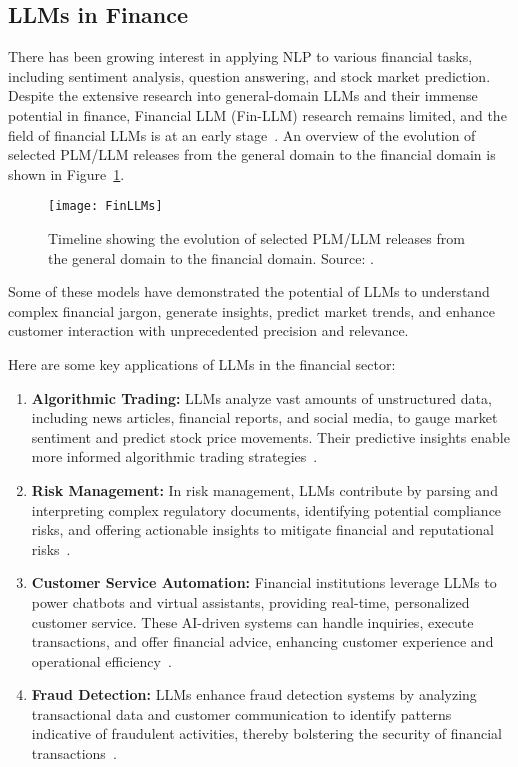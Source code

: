 \subsection{LLMs in Finance}
\label{subsec:llms-in-finance}

There has been growing interest in applying NLP to various financial tasks, including sentiment analysis, question answering, and stock market prediction.
Despite the extensive research into general-domain LLMs and their immense potential in finance, Financial LLM (Fin-LLM) research remains limited, and the field of financial LLMs is at an early stage~\cite{lee2024survey}.
An overview of the evolution of selected PLM/LLM releases from the general domain to the financial domain is shown in Figure~\ref{fig:llm-finance}.

\begin{figure}[h]
	\centering
	\texttt{[image: FinLLMs]}
	\caption{Timeline showing the evolution of selected PLM/LLM releases from the general domain to the financial domain. Source: \textcite{lee2024survey}.}
	\label{fig:llm-finance}
\end{figure}

Some of these models have demonstrated the potential of LLMs to understand complex financial jargon, generate insights, predict market trends, and enhance customer interaction with unprecedented precision and relevance.

Here are some key applications of LLMs in the financial sector:

\begin{enumerate}
	\item \textbf{Algorithmic Trading:}
	      {LLMs analyze vast amounts of unstructured data, including news articles, financial reports, and social media, to gauge market sentiment and predict stock price movements.
		      Their predictive insights enable more informed algorithmic trading strategies~\cite{buehler2018deep}.}

	\item \textbf{Risk Management:}
	      {In risk management, LLMs contribute by parsing and interpreting complex regulatory documents, identifying potential compliance risks, and offering actionable insights to mitigate financial and reputational risks~\cite{li2020natural}.}

	\item \textbf{Customer Service Automation:}
	      {Financial institutions leverage LLMs to power chatbots and virtual assistants, providing real-time, personalized customer service. These AI-driven systems can handle inquiries, execute transactions, and offer financial advice, enhancing customer experience and operational efficiency~\cite{pal2021enhancing}.}

	\item \textbf{Fraud Detection:}
	      {LLMs enhance fraud detection systems by analyzing transactional data and customer communication to identify patterns indicative of fraudulent activities, thereby bolstering the security of financial transactions~\cite{smith2019improving}.}
\end{enumerate}

